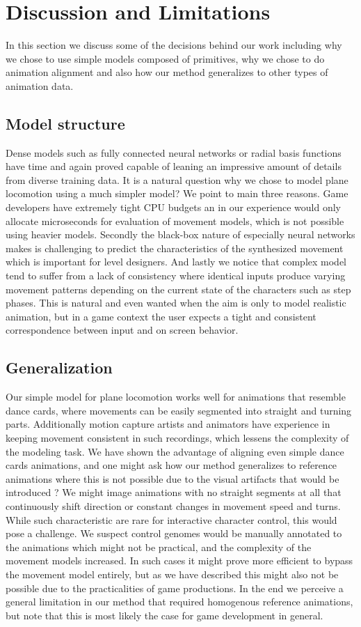 \section{Discussion and Limitations}
In this section we discuss some of the decisions behind our work including why we chose to use simple models composed of primitives, why we chose to do animation alignment and also how our method generalizes to other types of animation data. 

\subsection{Model structure}
Dense models such as fully connected neural networks or radial basis functions have time and again proved capable of leaning an impressive amount of details from diverse training data. It is a natural question why we chose to model plane locomotion using a much simpler model? We point to main three reasons. Game developers have extremely tight CPU budgets an in our experience would only allocate microseconds for evaluation of movement models, which is not possible using heavier models. Secondly the black-box nature of especially neural networks makes is challenging to predict the characteristics of the synthesized movement which is important for level designers. And lastly we notice that complex model tend to suffer from a lack of consistency where identical inputs produce varying movement patterns depending on the current state of the characters such as step phases. This is natural and even wanted when the aim is only to model realistic animation, but in a game context the user expects a tight and consistent correspondence between input and on screen behavior. 

\subsection{Generalization}
Our simple model for plane locomotion works well for animations that resemble dance cards, where movements can be easily segmented into straight and turning parts. Additionally motion capture artists and animators have experience in keeping movement consistent in such recordings, which lessens the complexity of the modeling task. We have shown the advantage of aligning even simple dance cards animations, and one might ask how our method generalizes to reference animations where this is not possible due to the visual artifacts that would be introduced ? We might image animations with no straight segments at all that continuously shift direction or constant changes in movement speed and turns. While such characteristic are rare for interactive character control, this would pose a challenge. We suspect control genomes would be manually annotated to the animations which might not be practical, and the complexity of the movement models increased. In such cases it might prove more efficient to bypass the movement model entirely, but as we have described this might also not be possible due to the practicalities of game productions. In the end we perceive a general limitation in our method that required homogenous reference animations, but note that this is most likely the case for game development in general. 

